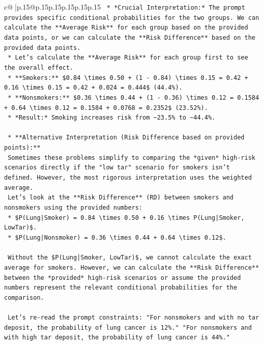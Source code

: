 \documentclass{article}
\begin{document}
{\begin{supertabular}{c@{$\;$}|p{.15\linewidth}@{}p{.15\linewidth}p{.15\linewidth}p{.15\linewidth}p{.15\linewidth}p{.15\linewidth}}
{{{\texttt{        *   *Crucial Interpretation:* The prompt provides specific conditional probabilities for the two groups. We can calculate the **Average Risk** for each group based on the provided data points, or we can calculate the **Risk Difference** based on the provided data points.} \\
\texttt{        *   Let's calculate the **Average Risk** for each group first to see the overall effect.} \\
\texttt{            *   **Smokers:** \$0.84 \textbackslash{}times 0.50 + (1 {-} 0.84) \textbackslash{}times 0.15 = 0.42 + 0.16 \textbackslash{}times 0.15 = 0.42 + 0.024 = 0.444\$ (44.4\%).} \\
\texttt{            *   **Nonsmokers:** \$0.36 \textbackslash{}times 0.44 + (1 {-} 0.36) \textbackslash{}times 0.12 = 0.1584 + 0.64 \textbackslash{}times 0.12 = 0.1584 + 0.0768 = 0.2352\$ (23.52\%).} \\
\texttt{            *   *Result:* Smoking increases risk from \textasciitilde{}23.5\% to \textasciitilde{}44.4\%.} \\
\\ 
\texttt{    *   **Alternative Interpretation (Risk Difference based on provided points):**} \\
\texttt{        Sometimes these problems simplify to comparing the *given* high{-}risk scenarios directly if the "low tar" scenario for smokers isn't defined. However, the most rigorous interpretation uses the weighted average.} \\
\texttt{        Let's look at the **Risk Difference** (RD) between smokers and nonsmokers using the provided numbers:} \\
\texttt{        *   \$P(Lung|Smoker) = 0.84 \textbackslash{}times 0.50 + 0.16 \textbackslash{}times P(Lung|Smoker, LowTar)\$.} \\
\texttt{        *   \$P(Lung|Nonsmoker) = 0.36 \textbackslash{}times 0.44 + 0.64 \textbackslash{}times 0.12\$.} \\
\\ 
\texttt{        Without the \$P(Lung|Smoker, LowTar)\$, we cannot calculate the exact average for smokers. However, we can calculate the **Risk Difference** between the *provided* high{-}risk scenarios or assume the provided numbers represent the relevant conditional probabilities for the comparison.} \\
\\ 
\texttt{        Let's re{-}read the prompt constraints: "For nonsmokers and with no tar deposit, the probability of lung cancer is 12\%." "For nonsmokers and with high tar deposit, the probability of lung cancer is 44\%."} \\
}}}
\end{supertabular}}
\end{document}
